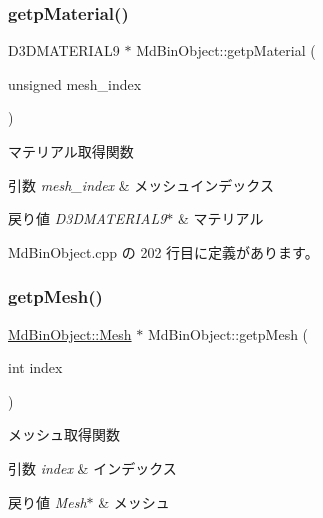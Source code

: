 \subsubsection{\texorpdfstring{getp\+Material()}{getpMaterial()}}
{\footnotesize\ttfamily D3\+D\+M\+A\+T\+E\+R\+I\+A\+L9 $\ast$ Md\+Bin\+Object\+::getp\+Material (\begin{DoxyParamCaption}\item[{unsigned}]{mesh\+\_\+index }\end{DoxyParamCaption})}



マテリアル取得関数 


\begin{DoxyParams}{引数}
{\em mesh\+\_\+index} & メッシュインデックス \\
\hline
\end{DoxyParams}

\begin{DoxyRetVals}{戻り値}
{\em D3\+D\+M\+A\+T\+E\+R\+I\+A\+L9$\ast$} & マテリアル \\
\hline
\end{DoxyRetVals}


 Md\+Bin\+Object.\+cpp の 202 行目に定義があります。

\mbox{\label{class_md_bin_object_ac1ac8fd593b33e3e1e4f6751bc42f758}} 
\subsubsection{\texorpdfstring{getp\+Mesh()}{getpMesh()}}
{\footnotesize\ttfamily \mbox{\hyperlink{class_md_bin_object_1_1_mesh}{Md\+Bin\+Object\+::\+Mesh}} $\ast$ Md\+Bin\+Object\+::getp\+Mesh (\begin{DoxyParamCaption}\item[{int}]{index }\end{DoxyParamCaption})}



メッシュ取得関数 


\begin{DoxyParams}{引数}
{\em index} & インデックス \\
\hline
\end{DoxyParams}

\begin{DoxyRetVals}{戻り値}
{\em Mesh$\ast$} & メッシュ \\
\hline
\end{DoxyRetVals}


